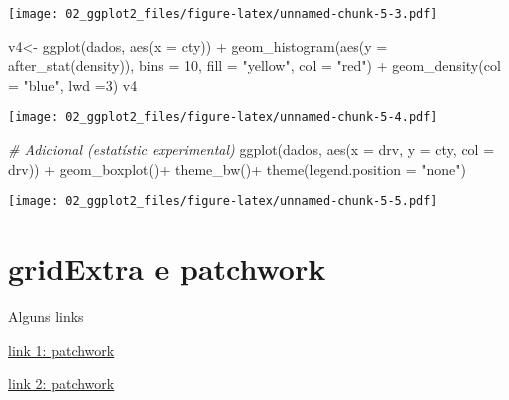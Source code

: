 \documentclass[
]{book}
\newenvironment{Shaded}{\begin{snugshade}}{\end{snugshade}}
\newcommand{\AttributeTok}[1]{\textcolor[rgb]{0.77,0.63,0.00}{#1}}
\newcommand{\CommentTok}[1]{\textcolor[rgb]{0.56,0.35,0.01}{\textit{#1}}}
\newcommand{\DecValTok}[1]{\textcolor[rgb]{0.00,0.00,0.81}{#1}}
\newcommand{\FunctionTok}[1]{\textcolor[rgb]{0.00,0.00,0.00}{#1}}
\newcommand{\NormalTok}[1]{#1}
\newcommand{\OtherTok}[1]{\textcolor[rgb]{0.56,0.35,0.01}{#1}}
\newcommand{\SpecialCharTok}[1]{\textcolor[rgb]{0.00,0.00,0.00}{#1}}
\newcommand{\StringTok}[1]{\textcolor[rgb]{0.31,0.60,0.02}{#1}}
\begin{document}
\texttt{[image: 02\_ggplot2\_files/figure-latex/unnamed-chunk-5-3.pdf]}

\begin{Shaded}
\begin{Highlighting}[]
\NormalTok{v4}\OtherTok{\textless{}{-}} \FunctionTok{ggplot}\NormalTok{(dados, }\FunctionTok{aes}\NormalTok{(}\AttributeTok{x =}\NormalTok{ cty)) }\SpecialCharTok{+} 
  \FunctionTok{geom\_histogram}\NormalTok{(}\FunctionTok{aes}\NormalTok{(}\AttributeTok{y =} \FunctionTok{after\_stat}\NormalTok{(density)),}
                 \AttributeTok{bins =} \DecValTok{10}\NormalTok{, }\AttributeTok{fill =} \StringTok{"yellow"}\NormalTok{, }\AttributeTok{col =} \StringTok{"red"}\NormalTok{) }\SpecialCharTok{+}
  \FunctionTok{geom\_density}\NormalTok{(}\AttributeTok{col =} \StringTok{"blue"}\NormalTok{, }\AttributeTok{lwd =}\DecValTok{3}\NormalTok{)}
\NormalTok{v4}
\end{Highlighting}
\end{Shaded}

\texttt{[image: 02\_ggplot2\_files/figure-latex/unnamed-chunk-5-4.pdf]}

\begin{Shaded}
\begin{Highlighting}[]
\CommentTok{\# Adicional (estatístic experimental)}
\FunctionTok{ggplot}\NormalTok{(dados, }\FunctionTok{aes}\NormalTok{(}\AttributeTok{x =}\NormalTok{ drv, }\AttributeTok{y =}\NormalTok{ cty, }\AttributeTok{col =}\NormalTok{ drv)) }\SpecialCharTok{+} 
  \FunctionTok{geom\_boxplot}\NormalTok{()}\SpecialCharTok{+}
  \FunctionTok{theme\_bw}\NormalTok{()}\SpecialCharTok{+}
  \FunctionTok{theme}\NormalTok{(}\AttributeTok{legend.position =} \StringTok{"none"}\NormalTok{)}
\end{Highlighting}
\end{Shaded}

\texttt{[image: 02\_ggplot2\_files/figure-latex/unnamed-chunk-5-5.pdf]}

\hypertarget{gridextra-e-patchwork}{%
\section{gridExtra e patchwork}\label{gridextra-e-patchwork}}

Alguns links

\href{https://patchwork.data-imaginist.com/articles/guides/assembly.html}{link 1: patchwork}

\href{https://patchwork.data-imaginist.com/articles/patchwork.html}{link 2: patchwork}
\end{document}
